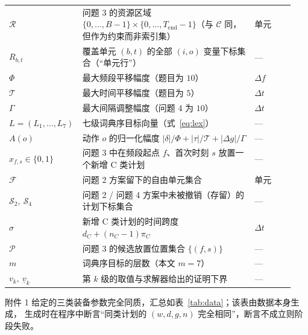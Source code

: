 \begin{longtable}{@{}p{0.20\linewidth}p{0.60\linewidth}p{0.14\linewidth}@{}}
$\mathcal{R}$ & 问题 3 的资源区域 $\{0,\dots,B-1\}\times\{0,\dots,T_{\mathrm{end}}-1\}$（与 $\mathcal{C}$ 同，但作为约束而非索引集） & 单元 \\
$R_{b,t}$ & 覆盖单元 $(b,t)$ 的全部 $(i,o)$ 变量下标集合（“单元行”） & --- \\
$\Phi$ & 最大频段平移幅度（题目为 $10$） & $\Delta f$ \\
$\mathcal{T}$ & 最大时间平移幅度（题目为 $5$） & $\Delta t$ \\
$\Gamma$ & 最大间隔调整幅度（问题 4 为 $10$） & $\Delta t$ \\
$L=(L_1,\dots,L_7)$ & 七级词典序目标向量（式~\eqref{eq:lex}） & --- \\
$A(o)$ & 动作 $o$ 的归一化幅度 $|\delta|/\Phi+|\tau|/\mathcal{T}+|\Delta g|/\Gamma$ & --- \\
$x_{f,s}\in\{0,1\}$ & 问题 3 中在频段起点 $f$、首次时刻 $s$ 放置一个新增 C 类计划 & --- \\
$\mathcal{F}$ & 问题 2 方案留下的自由单元集合 & 单元 \\
$\mathcal{S}_2,\ \mathcal{S}_4$ & 问题 2 / 问题 4 方案中未被撤销（存留）的计划下标集合 & --- \\
$\sigma$ & 新增 C 类计划的时间跨度 $d_C+(n_C-1)\pi_C$ & $\Delta t$ \\
$\mathcal{P}$ & 问题 3 的候选放置位置集合 $\{(f,s)\}$ & --- \\
$m$ & 词典序目标的层数（本文 $m=7$） & --- \\
$v_k,\ \underline{v}_k$ & 第 $k$ 级的取值与求解器给出的证明下界 & --- \\
\end{longtable}
\addtocounter{table}{-1}%

\noindent 附件 1 给定的三类装备参数完全同质，汇总如表~\ref{tab:data}；该表由数据本身生成，
生成时在程序中断言“同类计划的 $(w,d,g,n)$ 完全相同”，断言不成立则阶段失败。

\begin{table}[htbp]
\centering\small
\caption{附件 1 给定的三类用频装备参数（由数据生成，同类同参已在程序中断言）。
“时间跨度”为 $d+(n-1)(d+g)$，即单个计划从首次使用开始到最后一次使用结束所横跨的时长；
“单计划单元数”为 $w\,d\,n$。}
\label{tab:data}
\resizebox{\linewidth}{!}{}
\end{table}
